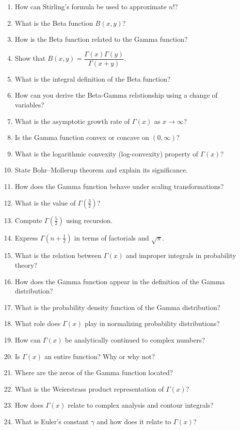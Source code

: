 \begin{enumerate}
  \item How can Stirling's formula be used to approximate $n!$?
  \item What is the Beta function $B(x,y)$?
  \item How is the Beta function related to the Gamma function?
  \item Show that $B(x,y) = \dfrac{\Gamma(x)\Gamma(y)}{\Gamma(x+y)}$.
  \item What is the integral definition of the Beta function?
  \item How can you derive the Beta-Gamma relationship using a change of variables?
  \item What is the asymptotic growth rate of $\Gamma(x)$ as $x \to \infty$?
  \item Is the Gamma function convex or concave on $(0,\infty)$?
  \item What is the logarithmic convexity (log-convexity) property of $\Gamma(x)$?
  \item State Bohr–Mollerup theorem and explain its significance.
  \item How does the Gamma function behave under scaling transformations?
  \item What is the value of $\Gamma\left(\tfrac{3}{2}\right)$?
  \item Compute $\Gamma\left(\tfrac{5}{2}\right)$ using recursion.
  \item Express $\Gamma\left(n+\tfrac{1}{2}\right)$ in terms of factorials and $\sqrt{\pi}$.
  \item What is the relation between $\Gamma(x)$ and improper integrals in probability theory?
  \item How does the Gamma function appear in the definition of the Gamma distribution?
  \item What is the probability density function of the Gamma distribution?
  \item What role does $\Gamma(x)$ play in normalizing probability distributions?
  \item How can $\Gamma(x)$ be analytically continued to complex numbers?
  \item Is $\Gamma(x)$ an entire function? Why or why not?
  \item Where are the zeros of the Gamma function located?
  \item What is the Weierstrass product representation of $\Gamma(x)$?
  \item How does $\Gamma(x)$ relate to complex analysis and contour integrals?
  \item What is Euler's constant $\gamma$ and how does it relate to $\Gamma(x)$?

\end{enumerate}
